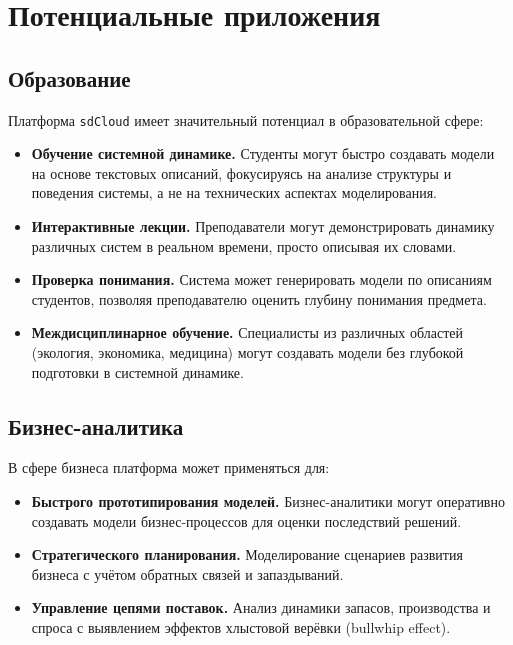 \section{Потенциальные приложения}

\subsection{Образование}

Платформа \texttt{sdCloud} имеет значительный потенциал в образовательной сфере:

\begin{itemize}
    \item \textbf{Обучение системной динамике.} Студенты могут быстро создавать модели на основе текстовых описаний, фокусируясь на анализе структуры и поведения системы, а не на технических аспектах моделирования.
    \item \textbf{Интерактивные лекции.} Преподаватели могут демонстрировать динамику различных систем в реальном времени, просто описывая их словами.
    \item \textbf{Проверка понимания.} Система может генерировать модели по описаниям студентов, позволяя преподавателю оценить глубину понимания предмета.
    \item \textbf{Междисциплинарное обучение.} Специалисты из различных областей (экология, экономика, медицина) могут создавать модели без глубокой подготовки в системной динамике.
\end{itemize}

\subsection{Бизнес-аналитика}

В сфере бизнеса платформа может применяться для:

\begin{itemize}
    \item \textbf{Быстрого прототипирования моделей.} Бизнес-аналитики могут оперативно создавать модели бизнес-процессов для оценки последствий решений.
    \item \textbf{Стратегического планирования.} Моделирование сценариев развития бизнеса с учётом обратных связей и запаздываний.
    \item \textbf{Управление цепями поставок.} Анализ динамики запасов, производства и спроса с выявлением эффектов хлыстовой верёвки (bullwhip effect).
\end{itemize}

